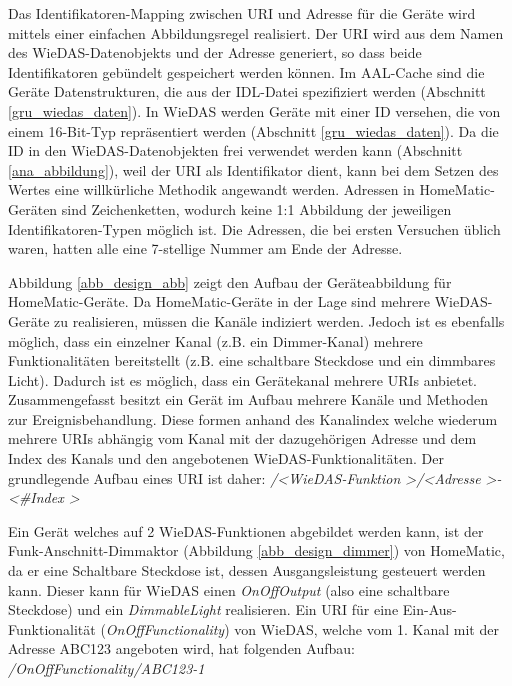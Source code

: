 Das Identifikatoren-Mapping zwischen URI und Adresse für die Geräte
wird mittels einer einfachen Abbildungsregel realisiert.
Der URI wird aus dem Namen des WieDAS-Datenobjekts und der Adresse generiert, so
dass beide Identifikatoren gebündelt gespeichert werden können.
Im AAL-Cache sind die Geräte Datenstrukturen, die aus der IDL-Datei spezifiziert werden (Abschnitt \ref{gru_wiedas_daten}).
In WieDAS werden Geräte mit einer ID versehen, die von einem 16-Bit-Typ repräsentiert
werden (Abschnitt \ref{gru_wiedas_daten}).
Da die ID in den WieDAS-Datenobjekten frei verwendet werden kann
(Abschnitt \ref{ana_abbildung}), weil der URI als Identifikator dient, kann bei dem Setzen des Wertes
eine willkürliche Methodik angewandt werden.
Adressen in HomeMatic-Geräten sind Zeichenketten, wodurch keine 1:1 Abbildung
der jeweiligen Identifikatoren-Typen möglich ist.
Die Adressen, die bei ersten Versuchen üblich waren, hatten alle eine 7-stellige Nummer
am Ende der Adresse.

\pagebreak


Abbildung \ref{abb_design_abb} zeigt den Aufbau der Geräteabbildung für HomeMatic-Geräte.
Da HomeMatic-Geräte in der Lage sind mehrere WieDAS-Geräte zu realisieren,
müssen die Kanäle indiziert werden.
Jedoch ist es ebenfalls möglich, dass ein einzelner Kanal (z.B. ein Dimmer-Kanal)
mehrere Funktionalitäten bereitstellt (z.B. eine schaltbare Steckdose und ein dimmbares Licht).
Dadurch ist es möglich, dass ein Gerätekanal mehrere URIs anbietet.
Zusammengefasst besitzt ein Gerät im Aufbau mehrere Kanäle und Methoden zur Ereignisbehandlung.
Diese formen anhand des Kanalindex 
welche wiederum mehrere
URIs abhängig vom Kanal mit der dazugehörigen Adresse und dem Index des Kanals und den
angebotenen WieDAS-Funktionalitäten.
Der grundlegende Aufbau eines URI ist daher:
\emph{/\textless WieDAS-Funktion \textgreater/\textless Adresse \textgreater - \textless \#Index \textgreater}


Ein Gerät welches auf 2 WieDAS-Funktionen abgebildet werden kann, ist der
Funk-Anschnitt-Dimmaktor (Abbildung \ref{abb_design_dimmer}) von HomeMatic,
da er eine Schaltbare Steckdose ist, dessen Ausgangsleistung gesteuert werden kann.
Dieser kann für WieDAS einen \emph{OnOffOutput} (also eine schaltbare Steckdose) und
ein \emph{DimmableLight} realisieren.
Ein URI für eine Ein-Aus-Funktionalität (\emph{OnOffFunctionality}) von WieDAS,
welche vom 1. Kanal mit der Adresse ABC123 angeboten wird, hat folgenden Aufbau:
\emph{/OnOffFunctionality/ABC123-1}

